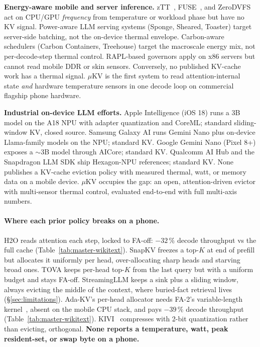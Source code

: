 \documentclass[sigconf, anonymous=false, screen=true]{acmart}
\begin{document}
\textbf{Energy-aware mobile and server inference.} zTT~\cite{kim2021ztt}, FUSE~\cite{liu2022fuse}, and ZeroDVFS act on CPU/GPU \emph{frequency} from temperature or workload phase but have no KV signal. Power-aware LLM serving systems (Sponge, Sheared, Toaster) target server-side batching, not the on-device thermal envelope. Carbon-aware schedulers (Carbon Containers, Treehouse) target the macroscale energy mix, not per-decode-step thermal control. RAPL-based governors apply on x86 servers but cannot read mobile DDR or skin sensors. Conversely, no published KV-cache work has a thermal signal. $\mu$KV is the first system to read attention-internal state \emph{and} hardware temperature sensors in one decode loop on commercial flagship phone hardware.

\textbf{Industrial on-device LLM efforts.} Apple Intelligence (iOS 18) runs a 3B model on the A18 NPU with adapter quantization and CoreML; standard sliding-window KV, closed source. Samsung Galaxy AI runs Gemini Nano plus on-device Llama-family models on the NPU; standard KV. Google Gemini Nano (Pixel 8+) exposes a $\sim$3B model through AICore; standard KV. Qualcomm AI Hub and the Snapdragon LLM SDK ship Hexagon-NPU references; standard KV. None publishes a KV-cache eviction policy with measured thermal, watt, or memory data on a mobile device. $\mu$KV occupies the gap: an open, attention-driven evictor with multi-sensor thermal control, evaluated end-to-end with full multi-axis numbers.

\paragraph{Where each prior policy breaks on a phone.} H2O reads attention each step, locked to FA-off: $-32\,\%$ decode throughput vs the full cache (Table~\ref{tab:master-wikitext}). SnapKV freezes a top-$K$ at end of prefill but allocates it uniformly per head, over-allocating sharp heads and starving broad ones. TOVA keeps per-head top-$K$ from the last query but with a uniform budget and stays FA-off. StreamingLLM keeps a sink plus a sliding window, always evicting the middle of the context, where buried-fact retrieval lives (\S\ref{sec:limitations}). Ada-KV's per-head allocator needs FA-2's variable-length kernel~\cite{dao2023flashattention2}, absent on the mobile CPU stack, and pays $-39\,\%$ decode throughput (Table~\ref{tab:master-wikitext}). KIVI~\cite{liu2024kivi} compresses with 2-bit quantization rather than evicting, orthogonal. \textbf{None reports a temperature, watt, peak resident-set, or swap byte on a phone.}
\end{document}
